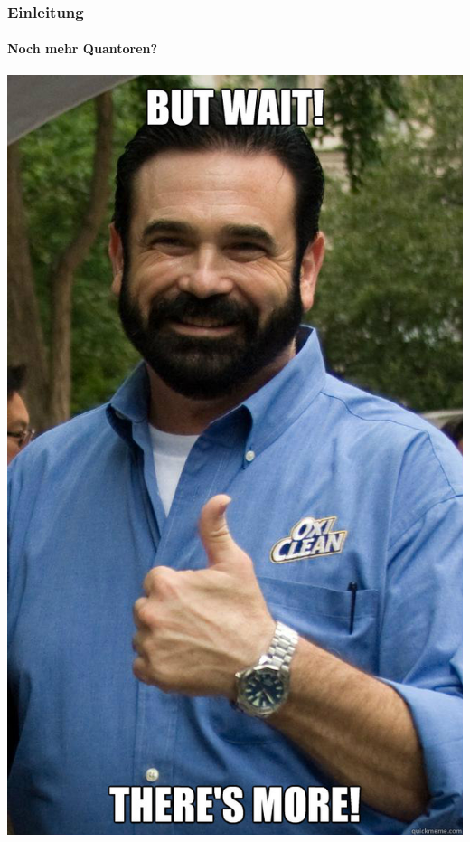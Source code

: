 \begin{frame}
	\frametitle{Einleitung}
	\framesubtitle{Noch mehr Quantoren?}
	\begin{center}
		\includegraphics[scale = 0.15]{images/more.jpg}
	\end{center}
\end{frame}